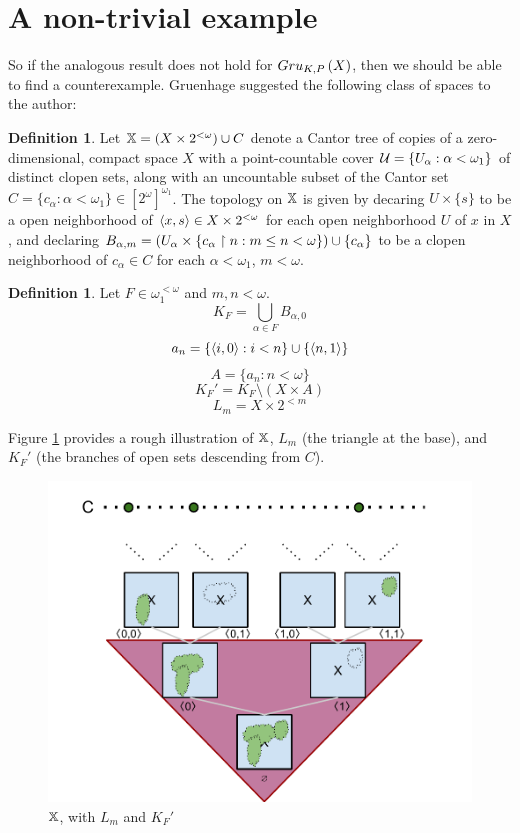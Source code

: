 \documentclass{amsart}
\theoremstyle{definition}
\newtheorem{definition}[theorem]{Definition}
\begin{document}
\section{A non-trivial example}

So if the analogous result does not hold for $Gru_{K,P}\left({X}\right)$, then we
should be able to find a counterexample. Gruenhage suggested the following
class of spaces to the author:

\begin{definition}
  Let $\mathbb{X}=(X\times 2^{<\omega})\cup C$ denote a Cantor tree
  of copies of a zero-dimensional, compact space $X$ with a point-countable
  cover $\mathcal{U} = \{U_\alpha : \alpha<\omega_1\}$ of distinct
  clopen sets, along with an uncountable subset of the Cantor set
  $C=\{c_\alpha:\alpha<\omega_1\}\in [2^\omega]^{\omega_1}$.
  The topology on $\mathbb{X}$ is given by decaring $U\times\{s\}$ to be a open
  neighborhood of $\langle x,s\rangle\in X\times 2^{<\omega}$ for each
  open neighborhood $U$ of $x$ in $X$, and declaring
  $
    B_{\alpha,m}
      =
    (U_\alpha\times\{c_\alpha\restriction n: m\leq n<\omega\})\cup\{c_\alpha\}
  $
  to be a clopen neighborhood of $c_\alpha\in C$ for each $\alpha<\omega_1$,
  $m<\omega$.
\end{definition}

\begin{definition}
  Let $F\in \omega_1^{<\omega}$ and $m,n<\omega$.
  \[
    K_F = \bigcup_{\alpha \in F} B_{\alpha,0}
  \]
  \[
    a_n = \{\langle i,0\rangle:i<n\}\cup\{\langle n,1\rangle\}
  \]
  \[
    A = \{a_n : n<\omega\}
  \]
  \[
    K_F' = K_F \setminus (X \times A)
  \]
  \[
    L_m = X \times 2^{<m}
  \]
\end{definition}

Figure \ref{fig:pmbX} provides a rough illustration of
$\mathbb{X}$, $L_m$ (the triangle at the base), and $K_F'$
(the branches of open sets descending from $C$).

\begin{figure}
  \centering
  \includegraphics[width=\linewidth]{pmbX.pdf}
  \caption{$\mathbb{X}$, with $L_m$ and $K_F'$}
  \label{fig:pmbX}
\end{figure}
\end{document}
